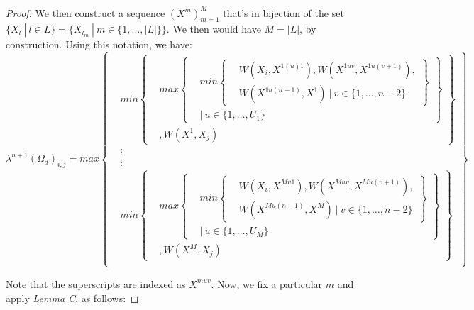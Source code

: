 \documentclass{article} %
\begin{document}
\begin{proof}
We then construct a sequence $(X^m)_{m=1}^M$ that's in bijection of the set $\{X_l\ |\ l\in L\}=\big\{X_{l_m}\ |\ m\in\{1,\ldots,|L|\}\big\}$. We then would have $M=|L|$, by construction. Using this notation, we have:
\[
\lambda^{n+1}(\Omega_d)_{i,j} =max
\left\{
  \begin{aligned}
    &min
      \left\{
      \begin{aligned}
        &max
          \left\{
          \begin{aligned}
            &min\left\{
            \begin{aligned}
            &W(X_i,X^{1(u)1}), W(X^{1uv},X^{1u(v+1)}), \\
            &W(X^{1u(n-1)},X^1)\ |\ v\in\{1,\ldots,n-2\}
            \end{aligned}
            \right\} \\
            &|\ u\in\{1,\ldots,U_1\}
          \end{aligned}
          \right\} \\
          &, W(X^1,X_j)
      \end{aligned}
      \right\} \\
      &\vdots \\
      &\vdots \\
    &min
      \left\{
      \begin{aligned}
        &max
          \left\{
          \begin{aligned}
            &min\left\{
            \begin{aligned}
            &W(X_i,X^{Mu1}), W(X^{Muv},X^{Mu(v+1)}), \\
            &W(X^{Mu(n-1)},X^M)\ |\ v\in\{1,\ldots,n-2\}
            \end{aligned}
            \right\} \\
            &|\ u\in\{1,\ldots,U_M\}
          \end{aligned}
          \right\} \\
          &, W(X^M,X_j)
      \end{aligned}
      \right\} \\
  \end{aligned}
\right\}
\]

Note that the superscripts are indexed as $X^{muv}$. Now, we fix a particular $m$ and apply \textit{Lemma C}, as follows:


\end{proof}
\end{document}
